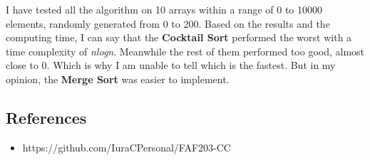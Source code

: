 \documentclass[a4paper, 12pt]{article}
\begin{document}
I have tested all the algorithm on 10 arrays within a range of 0 to 10000 elements, 
randomly generated from 0 to 200. Based on the results and the computing time, I can 
say that the \textbf{Cocktail Sort} performed the worst with a time complexity of \textit{nlogn}. 
Meanwhile the rest of them performed too good, almost close to 0. Which is why I am unable 
to tell which is the fastest. But in my opinion, the \textbf{Merge Sort} was easier to implement.

\subsection{References}

\begin{itemize}
  \item https://github.com/IuraCPersonal/FAF203-CC
\end{itemize}
\end{document}
